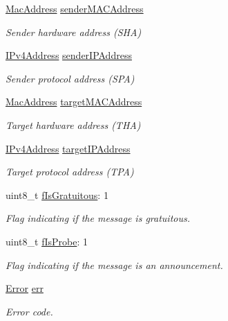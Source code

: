 \begin{DoxyCompactItemize}
\mbox{\hyperlink{ethernet_types_8h_ae4e06476597d217d540a5e2b2d699649}{Mac\+Address}} \mbox{\hyperlink{struct_a_r_pmessage__t_a373dc2ffcc6b2a5b9a8682478906c256}{sender\+M\+A\+C\+Address}}
\begin{DoxyCompactList}\small\item\em Sender hardware address (S\+HA) \end{DoxyCompactList}\item 
\mbox{\hyperlink{group__ipv4_gaea6452a06c6a1edb025bdd2a70fef14c}{I\+Pv4\+Address}} \mbox{\hyperlink{struct_a_r_pmessage__t_a327239df3565c3a31da48f74b65e15b1}{sender\+I\+P\+Address}}
\begin{DoxyCompactList}\small\item\em Sender protocol address (S\+PA) \end{DoxyCompactList}\item 
\mbox{\hyperlink{ethernet_types_8h_ae4e06476597d217d540a5e2b2d699649}{Mac\+Address}} \mbox{\hyperlink{struct_a_r_pmessage__t_a2502d1b812373dc5a0de1647165b40ea}{target\+M\+A\+C\+Address}}
\begin{DoxyCompactList}\small\item\em Target hardware address (T\+HA) \end{DoxyCompactList}\item 
\mbox{\hyperlink{group__ipv4_gaea6452a06c6a1edb025bdd2a70fef14c}{I\+Pv4\+Address}} \mbox{\hyperlink{struct_a_r_pmessage__t_a810f2c0c6e91e68940dbf87740664f0f}{target\+I\+P\+Address}}
\begin{DoxyCompactList}\small\item\em Target protocol address (T\+PA) \end{DoxyCompactList}\item 
uint8\+\_\+t \mbox{\hyperlink{struct_a_r_pmessage__t_a10f6f518105e71039413d95c27db5a5d}{f\+Is\+Gratuitous}}\+: 1
\begin{DoxyCompactList}\small\item\em Flag indicating if the message is gratuitous. \end{DoxyCompactList}\item 
uint8\+\_\+t \mbox{\hyperlink{struct_a_r_pmessage__t_ad84934498bc8cb014f7ccfd3df0eaaab}{f\+Is\+Probe}}\+: 1
\begin{DoxyCompactList}\small\item\em Flag indicating if the message is an announcement. \end{DoxyCompactList}\item 
\mbox{\hyperlink{group__error_gada9d6bcf34dabaf048e197cb7b69fa6a}{Error}} \mbox{\hyperlink{struct_a_r_pmessage__t_a9078d3b85b5a7c46fc5c80899bd3b6b3}{err}}
\begin{DoxyCompactList}\small\item\em Error code. \end{DoxyCompactList}\end{DoxyCompactItemize}


